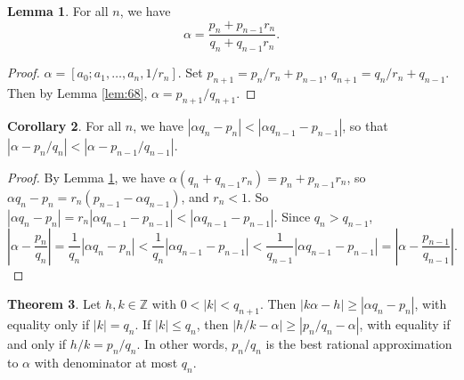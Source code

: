 \documentclass{article}
\newcommand{\Z}{\mathbb{Z}}
\newcommand{\rb}[1]{\left( #1 \right)}
\renewcommand{\sb}[1]{\left[ #1 \right]}
\newcommand{\abs}[1]{\left\lvert #1 \right\rvert}
\theoremstyle{definition}\newtheorem{definition}{Definition}
\theoremstyle{definition}\newtheorem{remark}[definition]{Remark}
\theoremstyle{definition}\newtheorem*{example}{Example}
\theoremstyle{definition}\newtheorem*{note}{Note}
\newtheorem{lemma}[definition]{Lemma}
\newtheorem{theorem}[definition]{Theorem}
\newtheorem{corollary}[definition]{Corollary}
\begin{document}
\begin{lemma}
\label{lem:72}
For all $ n $, we have
$$ \alpha = \dfrac{p_n + p_{n - 1}r_n}{q_n + q_{n - 1}r_n}. $$
\end{lemma}

\begin{proof}
$ \alpha = \sb{a_0; a_1, \dots, a_n, 1 / r_n} $. Set $ p_{n + 1} = p_n / r_n + p_{n - 1} $, $ q_{n + 1} = q_n / r_n + q_{n - 1} $. Then by Lemma \ref{lem:68}, $ \alpha = p_{n + 1} / q_{n + 1} $.
\end{proof}

\begin{corollary}
For all $ n $, we have $ \abs{\alpha q_n - p_n} < \abs{\alpha q_{n - 1} - p_{n - 1}} $, so that $ \abs{\alpha - p_n / q_n} < \abs{\alpha - p_{n - 1} / q_{n - 1}} $.
\end{corollary}

\begin{proof}
By Lemma \ref{lem:72}, we have $ \alpha\rb{q_n + q_{n - 1}r_n} = p_n + p_{n - 1}r_n $, so $ \alpha q_n - p_n = r_n\rb{p_{n - 1} - \alpha q_{n - 1}} $, and $ r_n < 1 $. So $ \abs{\alpha q_n - p_n} = r_n\abs{\alpha q_{n - 1} - p_{n - 1}} < \abs{\alpha q_{n - 1} - p_{n - 1}} $. Since $ q_n > q_{n - 1} $,
$$ \abs{\alpha - \dfrac{p_n}{q_n}} = \dfrac{1}{q_n}\abs{\alpha q_n - p_n} < \dfrac{1}{q_n}\abs{\alpha q_{n - 1} - p_{n - 1}} < \dfrac{1}{q_{n - 1}}\abs{\alpha q_{n - 1} - p_{n - 1}} = \abs{\alpha - \dfrac{p_{n - 1}}{q_{n - 1}}}. $$
\end{proof}

\begin{theorem}
\label{thm:74}
Let $ h, k \in \Z $ with $ 0 < \abs{k} < q_{n + 1} $. Then $ \abs{k\alpha - h} \ge \abs{\alpha q_n - p_n} $, with equality only if $ \abs{k} = q_n $. If $ \abs{k} \le q_n $, then $ \abs{h / k - \alpha} \ge \abs{p_n / q_n - \alpha} $, with equality if and only if $ h / k = p_n / q_n $. In other words, $ p_n / q_n $ is the best rational approximation to $ \alpha $ with denominator at most $ q_n $.
\end{theorem}
\end{document}
